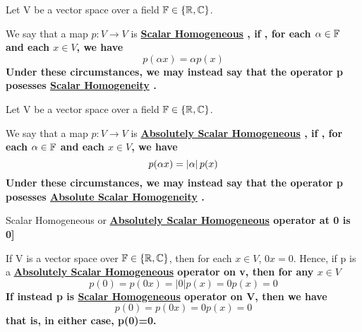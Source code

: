 \label{def:scalarhomogeneous}
\newcommand{\ScalarHomogeneous}[0]{
    \bf \hyperref[def:scalarhomogeneous]{Scalar Homogeneous} \rm
}

\newcommand{\ScalarHomogeneity}[0]{
    \bf \hyperref[def:scalarhomogeneous]{Scalar Homogeneity} \rm
}
\begin{df}
    Let V be a vector space over a field $\mathbb{F} \in \{\mathbb{R}, \mathbb{C}\}$. 
    
    We say that a map $p:V \to V$ is \ScalarHomogeneous, if
    , for each $\alpha \in \mathbb{F}$ and each $x \in V$, we have 
    \begin{equation}
        p(\alpha x) = \alpha p(x)
    \end{equation}
    Under these circumstances, we may instead say that the operator 
    p posesses \ScalarHomogeneity.
\end{df}

\label{def:absolutevaluescalarhomogeneous}
\newcommand{\AbsScalarHomogeneous}[0]{
    \bf \hyperref[def:absolutevaluescalarhomogeneous]{Absolutely Scalar Homogeneous} \rm
}

\newcommand{\AbsScalarHomogeneity}[0]{
    \bf \hyperref[def:absolutevaluescalarhomogeneous]{Absolute Scalar Homogeneity} \rm
}
\begin{df}
    Let V be a vector space over a field $\mathbb{F} \in \{\mathbb{R}, \mathbb{C}\}$. 
    
    We say that a map $p:V \to V$ is \AbsScalarHomogeneous, if
    , for each $\alpha \in \mathbb{F}$ and each $x \in V$, we have 
    \begin{equation}
        p(\alpha x) = \left| \alpha \right| p(x)
    \end{equation}
    Under these circumstances, we may instead say that the operator 
    p posesses \AbsScalarHomogeneity.
\end{df}


\label{rmk:seminorm}
\begin{rmk}[\ScalarHomogeneous or \AbsScalarHomogeneous operator at 0 is 0]

If V is a vector space over $\mathbb{F} \in \{\mathbb{R}, \mathbb{C}\}$, then for each $x \in V$, $0x=0$.
Hence, if p is a \AbsScalarHomogeneous operator on v, then for any $x \in V$
\begin{equation}
p(0)=p(0x)=|0|p(x)=0p(x)=0
\end{equation}
If instead p is \ScalarHomogeneous operator on V, then we have
\begin{equation}
p(0)=p(0x)=0p(x)=0
\end{equation}
that is, in either case,  p(0)=0. 
\end{rmk}




